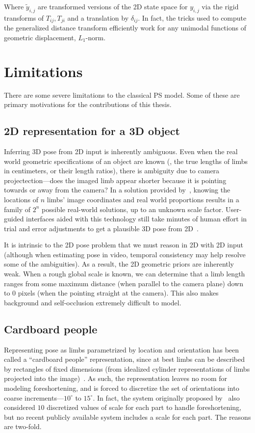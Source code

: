 Where $\tilde{y}_{i,j}$ are transformed versions of the 2D state space for 
$y_{i,j}$ via the rigid transforms of $T_{ij},T_{ji}$ and a translation by 
$\delta_{ij}$.  In fact, the tricks used to compute the generalized distance 
transform efficiently work for any unimodal functions of geometric 
displacement, \eg $L_1$-norm. 

\section{Limitations}
\label{sec:limitations}

There are some severe limitations to the classical PS model.  Some of these are 
primary motivations for the contributions of this thesis.  

\subsection{2D representation for a 3D object} Inferring 3D pose from 2D input 
is inherently ambiguous.  Even when the real world geometric specifications of 
an object are known (\eg, the true lengths of limbs in centimeters, or their 
length ratios), there is ambiguity due to camera projectection---does the 
imaged limb appear shorter because it is pointing towards or away from the 
camera?  In a solution provided by~\citet{cj-skel}, knowing the locations of 
$n$ limbs' image coordinates and real world proportions results in a family of 
$2^n$ possible real-world solutions, up to an unknown scale factor.  
User-guided interfaces aided with this technology still take minutes of human 
effort in trial and error adjustments to get a plausible 3D pose from 
2D~\citep{poselets}. 

It is intrinsic to the 2D pose problem that we must reason in 2D with 2D input 
(although when estimating pose in video, temporal consistency may help resolve 
some of the ambiguities).  As a result, the 2D geometric priors are inherently 
weak.  When a rough global scale is known, we can determine that a limb length 
ranges from some maximum distance (when parallel to the camera plane) down to 0 
pixels (when the pointing straight at the camera).  This also makes background 
and self-occlusion extremely difficult to model.

\subsection{Cardboard people}
Representing pose  as limbs parametrized by location and orientation has been 
called a ``cardboard people'' representation, since at best limbs can be 
described by rectangles of fixed dimensions (from idealized cylinder 
representations of limbs projected into the image)~\citep{cardboard}.  As such, 
the representation leaves no room for modeling foreshortening, and is forced to 
discretize the set of orientations into coarse increments---$10^\circ$ to 
$15^\circ$.  In fact, the system originally proposed by~\citet{felz05} also 
considered $10$ discretized values of scale for each part to handle 
foreshortening, but no recent publicly available system 
\citep{andriluka09,eichner09,sapp2010,sapp2010cascades,sapp2011} includes a 
scale for each part. The reasons are two-fold. 

